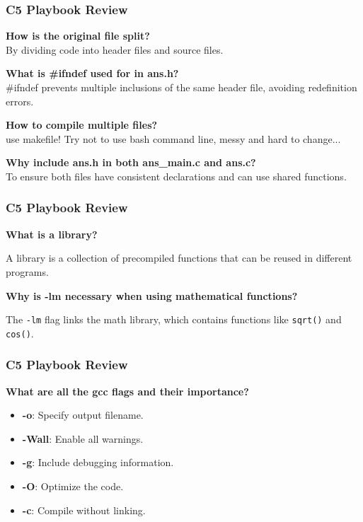 \documentclass[
	11pt, %
]{beamer}
\begin{document}
	\begin{frame}
		\frametitle{C5 Playbook Review}
		\textbf{How is the original file split?} \\
	By dividing code into header files and source files.
	
	\textbf{What is \#ifndef used for in ans.h?} \\
	\#ifndef prevents multiple inclusions of the same header file, avoiding redefinition errors.
	
	\textbf{How to compile multiple files?} \\
		use makefile! Try not to use bash command line, messy and hard to change...
	
	\textbf{Why include ans.h in both ans\_main.c and ans.c?} \\
	To ensure both files have consistent declarations and can use shared functions.
	\end{frame}











\begin{frame}{}
	\frametitle{C5 Playbook Review}
	\textbf{What is a library?}

	A library is a collection of precompiled functions that can be reused in different programs.

	\textbf{Why is -lm necessary when using mathematical functions?}
	
	The \texttt{-lm} flag links the math library, which contains functions like \texttt{sqrt()} and \texttt{cos()}.
  \end{frame}
  




\begin{frame}
	\frametitle{C5 Playbook Review}

	\textbf{What are all the gcc flags and their importance?}
	\begin{itemize}
		\item \textbf{-o}: Specify output filename.
		\item \textbf{-Wall}: Enable all warnings.
		\item \textbf{-g}: Include debugging information.
		\item \textbf{-O}: Optimize the code.
		\item \textbf{-c}: Compile without linking.
	\end{itemize}
\end{frame}
\end{document}
